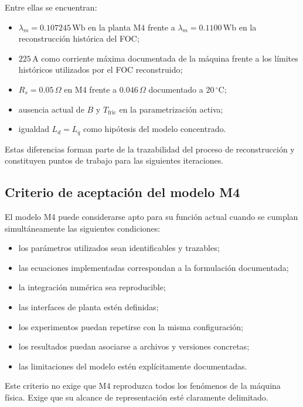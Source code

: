 Entre ellas se encuentran:

\begin{itemize}
    \item $\lambda_m=0.107245\,\mathrm{Wb}$ en la planta M4 frente a $\lambda_m=0.1100\,\mathrm{Wb}$ en la reconstrucción histórica del FOC;
    \item $225\,\mathrm{A}$ como corriente máxima documentada de la máquina frente a los límites históricos utilizados por el FOC reconstruido;
    \item $R_s=0.05\,\Omega$ en M4 frente a $0.046\,\Omega$ documentado a $20\,^{\circ}\mathrm{C}$;
    \item ausencia actual de $B$ y $T_{\mathrm{fric}}$ en la parametrización activa;
    \item igualdad $L_d=L_q$ como hipótesis del modelo concentrado.
\end{itemize}

Estas diferencias forman parte de la trazabilidad del proceso de reconstrucción y constituyen puntos de trabajo para las siguientes iteraciones.

\subsection{Criterio de aceptación del modelo M4}

El modelo M4 puede considerarse apto para su función actual cuando se cumplan simultáneamente las siguientes condiciones:

\begin{itemize}
    \item los parámetros utilizados sean identificables y trazables;
    \item las ecuaciones implementadas correspondan a la formulación documentada;
    \item la integración numérica sea reproducible;
    \item las interfaces de planta estén definidas;
    \item los experimentos puedan repetirse con la misma configuración;
    \item los resultados puedan asociarse a archivos y versiones concretas;
    \item las limitaciones del modelo estén explícitamente documentadas.
\end{itemize}

Este criterio no exige que M4 reproduzca todos los fenómenos de la máquina física. Exige que su alcance de representación esté claramente delimitado.

